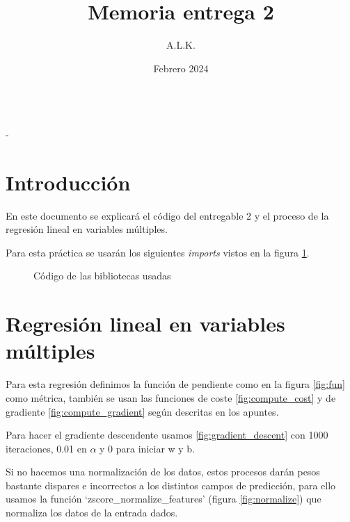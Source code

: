 \documentclass[6pt]{../../shared/AiTex}
\title{Memoria entrega 2}
\author{A.L.K.}
\date{Febrero 2024}
\begin{document}
\justify

\begin{center}

    {\huge \textbf{\underline{\subtitulo}}} \\
    { \lesson - \autor}

\end{center}


\section*{Introducción}

En este documento se explicará el código del entregable 2 y el proceso de la regresión lineal en variables múltiples.

Para esta práctica se usarán los siguientes \textit{imports} vistos en la figura \ref{fig:imports}.

\begin{figure}[H]
    \centering
    
    \caption{Código de las bibliotecas usadas}
    \label{fig:imports}
\end{figure}

\section{Regresión lineal en variables múltiples}

Para esta regresión definimos la función de pendiente como en la figura \ref{fig:fun} como métrica, también se usan las funciones de coste \ref{fig:compute_cost} y de gradiente \ref{fig:compute_gradient} según descritas en los apuntes.

Para hacer el gradiente descendente usamos \ref{fig:gradient_descent} con 1000 iteraciones, 0.01 en $\alpha$ y 0 para iniciar w y b.

Si no hacemos una normalización de los datos, estos procesos darán pesos bastante dispares e incorrectos a los distintos campos de predicción, para ello usamos la función `zscore\_normalize\_features' (figura \ref{fig:normalize}) que normaliza los datos de la entrada dados.
\end{document}

